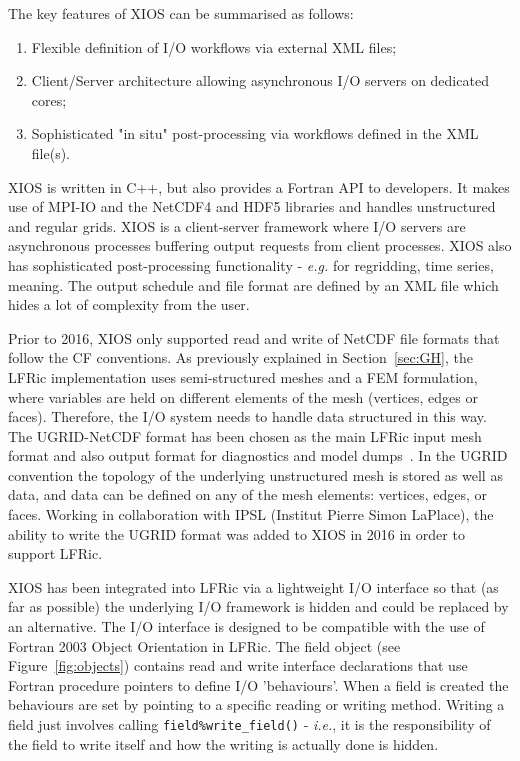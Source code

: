 \documentclass[review,times]{elsarticle}
\begin{document}
The key features of XIOS can be summarised as follows:
\begin{enumerate}
  \item Flexible definition of I/O workflows via external XML files;
  \item Client/Server architecture allowing asynchronous I/O servers on dedicated cores;
  \item Sophisticated "in situ" post-processing via workflows defined in the XML file(s). 
\end{enumerate}

XIOS is written in C++, but also provides a Fortran API to developers. It makes use of
MPI-IO and the NetCDF4 and HDF5 libraries and handles unstructured and regular grids.
XIOS is a client-server framework where I/O servers are asynchronous processes buffering
output requests from client processes. XIOS also has sophisticated post-processing
functionality - {\em e.g.} for regridding, time series, meaning. The output schedule and
file format are defined by an XML file which hides a lot of complexity from the user.

Prior to 2016, XIOS only supported read and write of NetCDF file formats that follow the CF
conventions.  As previously explained in Section~\ref{sec:GH}, the LFRic implementation uses
semi-structured meshes and a FEM formulation, where variables are held on
different elements of the mesh (vertices, edges or faces). Therefore, the I/O system needs to
handle data structured in this way. The UGRID-NetCDF format has been chosen as the main
LFRic input mesh format and also output format for diagnostics and model dumps~\cite{UgridSpec}.
In the UGRID convention the topology of the underlying unstructured mesh is stored as well as
data, and data can be defined on any of the mesh elements: vertices, edges, or faces.
Working in collaboration with IPSL (Institut Pierre Simon LaPlace), the ability to write the
UGRID format was added to XIOS in 2016 in order to support LFRic. 

XIOS has been integrated into LFRic via a lightweight I/O interface so
that (as far as possible) the underlying I/O framework is hidden and
could be replaced by an alternative.  The I/O interface is designed to
be compatible with the use of Fortran 2003 Object Orientation in
LFRic. The field object (see Figure~\ref{fig:objects}) contains read and write
interface declarations that use Fortran procedure pointers to define
I/O 'behaviours'. When a field is created the behaviours are set by
pointing to a specific reading or writing method. Writing a field just
involves calling \verb+field%write_field()+ - {\em i.e.}, it is the
responsibility of the field to write itself and how the writing is
actually done is hidden.
\end{document}
